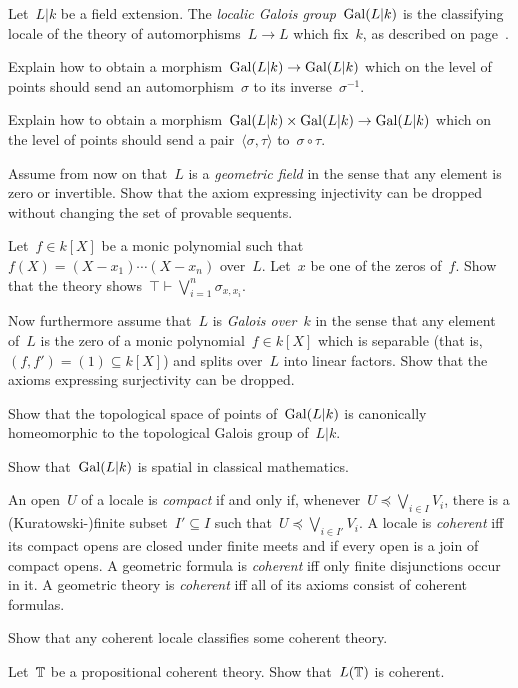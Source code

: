 \documentclass{ws-rv9x6}
\begin{document}
{\begin{exercise}%
Let~$L|k$ be a field extension. The \emph{localic Galois group}~$\mathrm{Gal}(L|k)$
is the classifying locale of the theory of automorphisms~$L \to L$ which
fix~$k$, as described on page~\pageref{par:theory-automorphisms}.
\begin{alphlist}[(g)]
\item Explain how to obtain a morphism~$\mathrm{Gal}(L|k) \to \mathrm{Gal}(L|k)$ which on the
level of points should send an automorphism~$\sigma$ to its inverse~$\sigma^{-1}$.
\item Explain how to obtain a morphism~$\mathrm{Gal}(L|k) \times \mathrm{Gal}(L|k) \to \mathrm{Gal}(L|k)$ which on the
level of points should send a pair~$\langle \sigma, \tau \rangle$ to~$\sigma \circ \tau$.
\item Assume from now on that~$L$ is a \emph{geometric field} in the sense that any
element is zero or invertible. Show that the axiom expressing injectivity can
be dropped without changing the set of provable sequents.
\item Let~$f \in k[X]$ be a monic polynomial such that~$f(X) =
(X-x_1)\cdots(X-x_n)$ over~$L$. Let~$x$ be one of the zeros of~$f$. Show that
the theory shows~$\top \vdash \bigvee_{i=1}^n \sigma_{x,x_i}$.
\item Now furthermore assume that~$L$ is \emph{Galois over}~$k$ in the sense that
any element of~$L$ is the zero of a monic polynomial~$f \in k[X]$ which is
separable (that is,~$(f,f') = (1) \subseteq k[X]$) and splits over~$L$ into
linear factors. Show that the axioms expressing surjectivity can be dropped.
\item Show that the topological space of points of~$\mathrm{Gal}(L|k)$ is canonically
homeomorphic to the topological Galois group of~$L|k$.
\item Show that~$\mathrm{Gal}(L|k)$ is spatial in classical mathematics.
\end{alphlist}
\end{exercise}

\begin{exercise}%
\label{ex:coherent}%
An open~$U$ of a locale is \emph{compact} if and only if, whenever~$U
\preceq \bigvee_{i \in I} V_i$, there is a (Kuratowski-)finite subset~$I'
\subseteq I$ such that~$U \preceq \bigvee_{i \in I'} V_i$. A locale is
\emph{coherent} iff its compact opens are closed under finite meets and if
every open is a join of compact opens. A geometric formula is \emph{coherent} iff only
finite disjunctions occur in it. A geometric theory is \emph{coherent}
iff all of its axioms consist of coherent formulas.
\begin{alphlist}[(d)]
\item Show that any coherent locale classifies some coherent theory.
\item Let~$\mathbb{T}$ be a propositional coherent theory. Show that~$L(\mathbb{T})$ is
coherent.\smallskip


\end{alphlist}
\end{exercise}}
\end{document}
